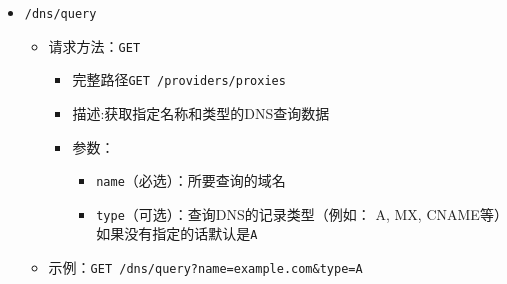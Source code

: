 \begin{itemize}
    \item \verb|/dns/query|
    \begin{itemize}
        \item 请求方法：\verb|GET|
        \begin{itemize}
            \item 完整路径\verb|GET /providers/proxies|
            \item 描述:获取指定名称和类型的DNS查询数据
            \item 参数：
            \begin{itemize}
                \item \verb|name|（必选）：所要查询的域名
                \item \verb|type|（可选）：查询DNS的记录类型（例如： A, MX, CNAME等）如果没有指定的话默认是\verb|A|
            \end{itemize}
        \end{itemize}
        \item 示例：\verb|GET /dns/query?name=example.com&type=A|
    \end{itemize}
\end{itemize}
